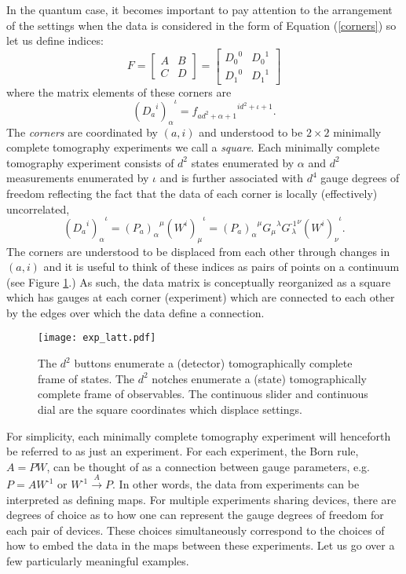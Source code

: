 \documentclass[pra, 10pt, notitlepage, twocolumn]{revtex4-1}
\newcommand{\inv}{\text{-1}}
\newcommand{\pref}[1]{(\ref{#1})}
\begin{document}
In the quantum case, it becomes important to pay attention to the arrangement of the settings when the data is considered in the form of Equation \pref{corners} so let us define indices:
\begin{equation}
F
=
\left[
\begin{array}{cc}
	A & B \\
	C & D
\end{array}
\right]
=
\left[
\begin{array}{cc}
	{D_0}^0 & {D_0}^1 \\
	{D_1}^0 & {D_1}^1
\end{array}
\right]
\end{equation}
where the matrix elements of these corners are
\begin{equation}
{({D_a}^i)_\alpha}^\iota
=
{f_{ad^2+\alpha+1}}^{id^2+\iota+1}.
\end{equation}
The \emph{corners} are coordinated by $(a,i)$ and understood to be $2\times2$ minimally complete tomography experiments we call a \emph{square}.
Each minimally complete tomography experiment consists of $d^2$ states enumerated by $\alpha$ and $d^2$ measurements enumerated by $\iota$
and is further associated with $d^4$ gauge degrees of freedom reflecting the fact that the data of each corner is locally (effectively) uncorrelated,
\begin{equation}\label{stuff}
	{({D_a}^i)_\alpha}^\iota = {(P_a)_\alpha}^\mu{(W^i)_\mu}^\iota
	= {(P_a)_\alpha}^\mu {G_\mu}^\lambda {G^\inv_{\,\lambda}}^\nu {(W^i)_\nu}^\iota.
\end{equation}
The corners are understood to be displaced from each other through changes in $(a,i)$
and it is useful to think of these indices as pairs of points on a continuum (see Figure \ref{cknobs}.)
As such, the data matrix is conceptually reorganized as a square which has gauges at each corner (experiment)
which are connected to each other by the edges over which the data define a connection.


\begin{figure}[h!]
\centering
\texttt{[image: exp\_latt.pdf]}
\caption{
The $d^2$ buttons enumerate a (detector) tomographically complete frame of states.
The $d^2$ notches enumerate a (state) tomographically complete frame of observables.
The continuous slider and continuous dial are the square coordinates which displace settings.
}\label{cknobs}
\end{figure}

For simplicity, each minimally complete tomography experiment will henceforth be referred to as just an experiment.
For each experiment, the Born rule, $A=PW$, can be thought of as a connection between gauge parameters, e.g. $P = A W^\inv$ or $W^\inv\xrightarrow{A}P$.
In other words, the data from experiments can be interpreted as defining maps.
For multiple experiments sharing devices, there are degrees of choice as to how one can represent the gauge degrees of freedom for each pair of devices.
These choices simultaneously correspond to the choices of how to embed the data in the maps between these experiments.
Let us go over a few particularly meaningful examples.
\end{document}
